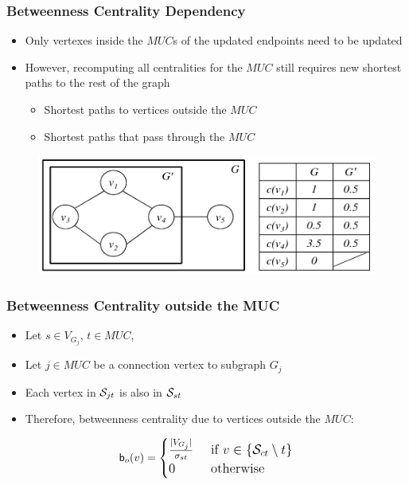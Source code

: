 \begin{frame}
  \frametitle{Betweenness Centrality Dependency}
  
  \begin{itemize}
    \item Only vertexes inside the $MUC$s of the updated endpoints need to be updated
    \item However, recomputing all centralities for the $MUC$ still requires new shortest paths to the rest of the graph
      \begin{itemize}
        \item Shortest paths to vertices outside the $MUC$
        \item Shortest paths that pass through the $MUC$
      \end{itemize}
  \end{itemize}
  
  \begin{figure}[t]
    \centering
    \includegraphics[width=\textwidth, height=0.6\textheight, keepaspectratio]{imgs/qube-btwmuc}
  \end{figure}
\end{frame}


\begin{frame}
  \frametitle{Betweenness Centrality outside the MUC}
  
  \begin{itemize}
    \item Let $s \in V_{G_j}$, $t \in MUC$,
    \item Let $j \in MUC$ be a connection vertex to subgraph $G_j$
    \item Each vertex in $\mathcal{S}_{jt}$ is also in $\mathcal{S}_{st}$
    \item Therefore, betweenness centrality due to vertices outside the $MUC$:    
  \end{itemize}
  
  \begin{align*}
    \large
    \mathsf{b}_{o}(v) = \begin{cases}
      \frac{|V_{G_j}|}{\sigma_{st}}		& \text{ if } v \in\{ \mathcal{S}_{ct} \setminus t \} \\
      0 						& \text{ otherwise }
    \end{cases}
  \end{align*}
\end{frame}


